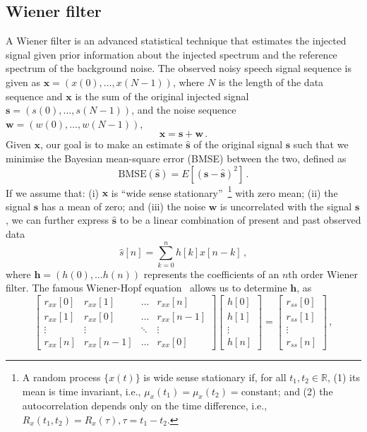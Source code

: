 \documentclass[aps,pra,superscriptaddress,reprint]{revtex4-2}
\begin{document}
\subsection{Wiener filter}
\label{sec:Wiener}

A Wiener filter is an advanced statistical technique that estimates the injected signal given prior information about the injected spectrum and the reference spectrum of the background noise. 
The observed noisy speech signal sequence is given as $\mathbf{x}=(x(0),\dots, x(N-1))$, where $N$ is the length of the data sequence and $\mathbf{x}$ is the sum of the original injected signal $\mathbf{s}=(s(0),\dots,s(N-1))$, and the noise sequence $\mathbf{w}=(w(0),\dots,w(N-1))$, 
\begin{equation}
    \mathbf{x}=\mathbf{s}+\mathbf{w}\,.
\end{equation}
Given $\textbf{x}$, our goal is to make an estimate $\hat{\textbf{s}}$ of the original signal $\textbf{s}$ such that we minimise the Bayesian mean-square error (BMSE) between the two, defined as 
\begin{equation}
\label{eq:BMSE}
\text{BMSE}(\hat{\textbf{s}})=E[(\textbf{s}-\hat{\textbf{s}})^2]\,.
\end{equation}
If we assume that: (i) $\textbf{x}$ is ``wide sense stationary''~\footnote{ A random process $\{x(t)\}$ is wide sense stationary if, for all $t_1,t_2 \in \mathbb{R}$, (1) its mean is time invariant, i.e., $\mu_x(t_1)=\mu_x(t_2)=\text{constant}$; and (2) the autocorrelation depends only on the time difference, i.e., $R_x(t_1,t_2)=R_x(\tau),\tau=t_1-t_2$.} with zero mean; (ii) the signal $\textbf{s}$ has a mean of zero; and (iii) the noise $\textbf{w}$ is uncorrelated with the signal $\textbf{s}$, we can further express $\hat{\textbf{s}}$ to be a linear combination of present and past observed data
\begin{equation}
\hat{{s}}[n]=\sum_{k=0}^{n}h[k]x[n-k]\,,
\end{equation}
where $\textbf{h}=(h(0),\dots h(n))$ represents the coefficients of an $n$th order Wiener filter.
The famous Wiener-Hopf equation~\citep{noble1959methods} allows us to determine $\textbf{h}$, as\begin{equation}
\label{eqn:wiener-hopf}
\begin{bmatrix}  
r_{xx}[0]&r_{xx}[1]&\dots& r_{xx}[n]\\
r_{xx}[1]&r_{xx}[0]&\dots &r_{xx}[n-1]\\
\vdots&\vdots&\ddots&\vdots\\
r_{xx}[n]&r_{xx}[n-1]&\dots &r_{xx}[0]
\end{bmatrix}
\begin{bmatrix}
h[0]\\
h[1]\\
\vdots\\
h[n]
\end{bmatrix}=
\begin{bmatrix}
r_{ss}[0]\\
r_{ss}[1]\\
\vdots\\
r_{ss}[n]
\end{bmatrix}\,,
\end{equation}
\end{document}
